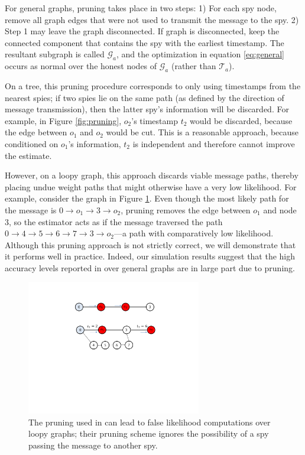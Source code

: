 For general graphs, pruning takes place in two steps: 1) For each spy node, remove all graph edges that were not used to transmit the message to the spy. 2) Step 1 may leave the graph disconnected. If graph is disconnected, keep the connected component that contains the spy with the earliest timestamp. The resultant subgraph is called $\mathcal G_a$, and the optimization in equation \ref{eq:general} occurs as normal over the honest nodes of $\mathcal G_a$ (rather than $\mathcal T_a$). 

On a tree, this pruning procedure corresponds to only using timestamps from the nearest spies; if two spies lie on the same path (as defined by the direction of message transmission), then the latter spy's information will be discarded. For example, in Figure \ref{fig:pruning}, $o_2$'s timestamp $t_2$ would be discarded, because the edge between $o_1$ and $o_2$ would be cut. This is a reasonable approach, because conditioned on $o_1$'s information, $t_2$ is independent and therefore cannot improve the estimate. 

However, on a loopy graph, this approach discards viable message paths, thereby placing undue weight paths that might otherwise have a very low likelihood. For example, consider the graph in Figure \ref{fig:pruning2}. Even though the most likely path for the message is $0\rightarrow o_1\rightarrow 3 \rightarrow o_2$, pruning removes the edge between $o_1$ and node $3$, so the estimator acts as if the message traversed the path $0\rightarrow 4\rightarrow 5 \rightarrow 6 \rightarrow 7 \rightarrow 3 \rightarrow o_2$---a path with comparatively low likelihood. Although this pruning approach is not strictly correct, we will demonstrate that it performs well in practice. Indeed, our simulation results suggest that the high accuracy levels reported in \cite{pinto} over general graphs are in large part due to pruning.
\begin{figure}[h]
\centering
\includegraphics[width=3in]{figures/pruning2}
\caption{The pruning used in \cite{pinto} can lead to false likelihood computations over loopy graphs; their pruning scheme ignores the possibility of a spy passing the message to another spy.
}
\label{fig:pruning2}
\end{figure}

